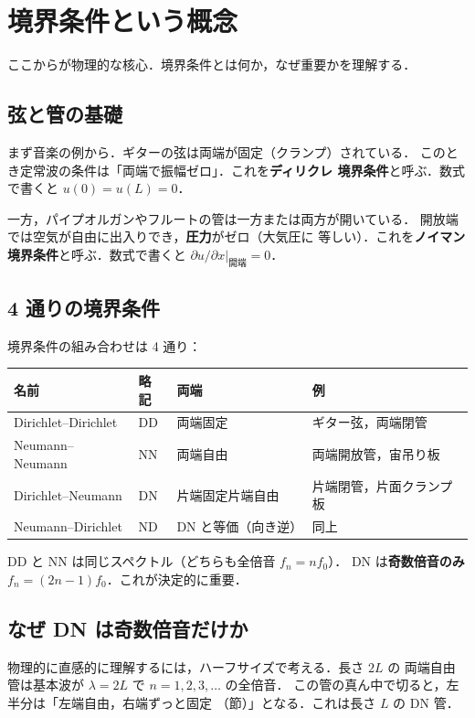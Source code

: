 \documentclass[11pt,a4paper]{article}
\begin{document}
\section{境界条件という概念}

ここからが物理的な核心．境界条件とは何か，なぜ重要かを理解する．

\subsection{弦と管の基礎}

まず音楽の例から．ギターの弦は両端が固定（クランプ）されている．
このとき定常波の条件は「両端で振幅ゼロ」．これを\textbf{ディリクレ
境界条件}と呼ぶ．数式で書くと $u(0) = u(L) = 0$．

一方，パイプオルガンやフルートの管は一方または両方が開いている．
開放端では空気が自由に出入りでき，\textbf{圧力}がゼロ（大気圧に
等しい）．これを\textbf{ノイマン境界条件}と呼ぶ．数式で書くと
$\partial u/\partial x|_{\text{開端}} = 0$．

\subsection{4 通りの境界条件}

境界条件の組み合わせは 4 通り：

\begin{center}
\begin{tabular}{llll}
\toprule
名前 & 略記 & 両端 & 例 \\
\midrule
Dirichlet--Dirichlet & DD & 両端固定 & ギター弦，両端閉管 \\
Neumann--Neumann & NN & 両端自由 & 両端開放管，宙吊り板 \\
Dirichlet--Neumann & DN & 片端固定片端自由 & 片端閉管，片面クランプ板 \\
Neumann--Dirichlet & ND & DN と等価（向き逆）& 同上 \\
\bottomrule
\end{tabular}
\end{center}

DD と NN は同じスペクトル（どちらも全倍音 $f_n = n f_0$）．
DN は\textbf{奇数倍音のみ} $f_n = (2n-1)f_0$．これが決定的に重要．

\subsection{なぜ DN は奇数倍音だけか}

物理的に直感的に理解するには，ハーフサイズで考える．長さ $2L$ の
両端自由管は基本波が $\lambda = 2L$ で $n=1,2,3,\ldots$ の全倍音．
この管の真ん中で切ると，左半分は「左端自由，右端ずっと固定
（節）」となる．これは長さ $L$ の DN 管．
\end{document}
